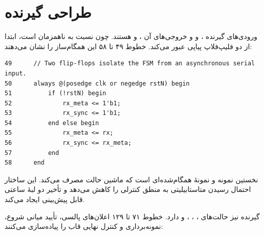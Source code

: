\section{طراحی گیرنده}

ورودی‌های گیرنده ،  و  و خروجی‌های آن
،  و  هستند. چون
 نسبت به  ناهمزمان است، ابتدا از دو فلیپ‌فلاپ پیاپی عبور می‌کند. خطوط
۴۹ تا ۵۸ این همگام‌ساز را نشان می‌دهند:

\begin{dsdlcodeblock}
\begin{verbatim}
49      // Two flip-flops isolate the FSM from an asynchronous serial input.
50      always @(posedge clk or negedge rstN) begin
51          if (!rstN) begin
52              rx_meta <= 1'b1;
53              rx_sync <= 1'b1;
54          end else begin
55              rx_meta <= rx;
56              rx_sync <= rx_meta;
57          end
58      end
\end{verbatim}
\end{dsdlcodeblock}

 نخستین نمونه و  نمونهٔ همگام‌شده‌ای است که ماشین حالت
مصرف می‌کند. این ساختار احتمال رسیدن متاستابیلیتی به منطق کنترلی را کاهش می‌دهد و تأخیر
دو لبهٔ ساعتی قابل پیش‌بینی ایجاد می‌کند.

گیرنده نیز حالت‌های ، ، ،  و
 دارد. خطوط ۷۱ تا ۱۲۹ اعلان‌های پالسی، تأیید میانی شروع، نمونه‌برداری و کنترل
نهایی قاب را پیاده‌سازی می‌کنند:

